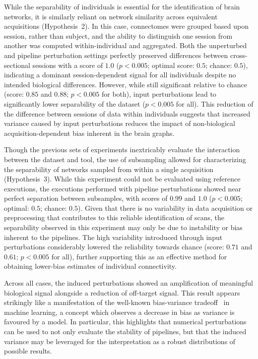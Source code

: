 \documentclass[fleqn,10pt]{SelfArx} %
\begin{document}
While the separability of individuals is essential for the identification of brain networks, it is similarly reliant on
network similarity across equivalent acquisitions (Hypothesis~2). In this case, connectomes were grouped based upon
session, rather than subject, and the ability to distinguish one session from another was computed within-individual
and aggregated. Both the unperturbed and pipeline perturbation settings perfectly preserved differences between
cross-sectional sessions with a score of $1.0$ ($p < 0.005$; optimal score: $0.5$; chance: $0.5$), indicating a
dominant session-dependent signal for all individuals despite no intended biological differences. However, while still
significant relative to chance (score: $0.85$ and $0.88$; $p < 0.005$ for both), input perturbations lead to
significantly lower separability of the dataset ($p < 0.005$ for all). This reduction of the difference between
sessions of data within individuals suggests that increased variance caused by input perturbations reduces the impact
of non-biological acquisition-dependent bias inherent in the brain graphs.

Though the previous sets of experiments inextricably evaluate the interaction between the dataset and tool, the use of
subsampling allowed for characterizing the separability of networks sampled from within a single acquisition
(Hypothesis~3). While this experiment could not be evaluated using reference executions, the executions performed
with pipeline perturbations showed near perfect separation between subsamples, with scores of $0.99$ and $1.0$
($p < 0.005$; optimal: $0.5$; chance: $0.5$). Given that there is no variability in data acquisition or preprocessing
that contributes to this reliable identification of scans, the separability observed in this experiment may only be due
to instability or bias inherent to the pipelines. The high variability introduced through input perturbations
considerably lowered the reliability towards chance (score: $0.71$ and $0.61$; $p < 0.005$ for all), further supporting
this as an effective method for obtaining lower-bias estimates of individual connectivity.

Across all cases, the induced perturbations showed an amplification of meaningful biological signal alongside a
reduction of off-target signal. This result appears strikingly like a manifestation of the well-known bias-variance
tradeoff~\cite{geman1992neural} in machine learning, a concept which observes a decrease in bias as variance is
favoured by a model. In particular, this highlights that numerical perturbations can be used to not only evaluate the
stability of pipelines, but that the induced variance may be leveraged for the interpretation as a robust distributions
of possible results.
\end{document}
